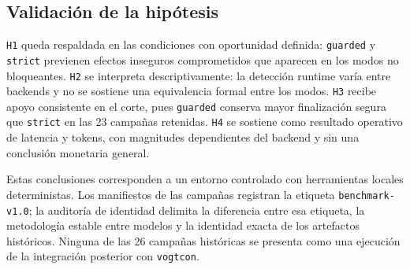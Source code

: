 \subsection{Validaci\'on de la hip\'otesis}
\texttt{H1} queda respaldada en las condiciones con oportunidad definida: \texttt{guarded} y \texttt{strict} previenen efectos inseguros comprometidos que aparecen en los modos no bloqueantes. \texttt{H2} se interpreta descriptivamente: la detecci\'on runtime var\'ia entre backends y no se sostiene una equivalencia formal entre los modos. \texttt{H3} recibe apoyo consistente en el corte, pues \texttt{guarded} conserva mayor finalizaci\'on segura que \texttt{strict} en las 23 campa\~nas retenidas. \texttt{H4} se sostiene como resultado operativo de latencia y tokens, con magnitudes dependientes del backend y sin una conclusi\'on monetaria general.

Estas conclusiones corresponden a un entorno controlado con herramientas locales deterministas. Los manifiestos de las campa\~nas registran la etiqueta \texttt{benchmark-v1.0}; la auditor\'ia de identidad delimita la diferencia entre esa etiqueta, la metodolog\'ia estable entre modelos y la identidad exacta de los artefactos hist\'oricos. Ninguna de las 26 campa\~nas hist\'oricas se presenta como una ejecuci\'on de la integraci\'on posterior con \texttt{vogtcon}.
